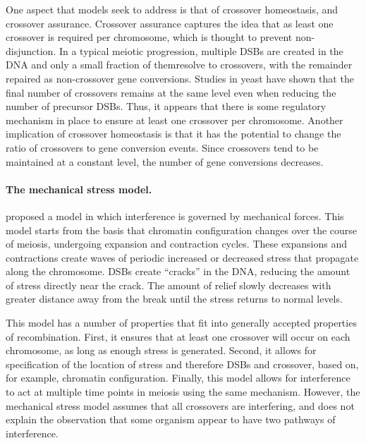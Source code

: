 One aspect that models seek to address is that of crossover homeostasis, and crossover assurance.
Crossover assurance captures the idea that as least one crossover is required per chromosome, which is thought to prevent non-disjunction.
In a typical meiotic progression, multiple DSBs are created in the DNA and only a small fraction of themresolve to crossovers, with the remainder repaired as non-crossover gene conversions.
Studies in yeast have shown that the final number of crossovers remains at the same level even when reducing the number of precursor DSBs\cite{Martini2006}.
Thus, it appears that there is some regulatory mechanism in place to ensure at least one crossover per chromosome.
Another implication of crossover homeostasis is that it has the potential to change the ratio of crossovers to gene conversion events.
Since crossovers tend to be maintained at a constant level, the number of gene conversions decreases.



\paragraph{The mechanical stress model.}
\citet{Kleckner2004} proposed a model in which interference is governed by mechanical forces.
This model starts from the basis that chromatin configuration changes over the course of meiosis, undergoing expansion and contraction cycles.
These expansions and contractions create waves of periodic increased or decreased stress that propagate along the chromosome.
DSBs create ``cracks'' in the DNA, reducing the amount of stress directly near the crack.
The amount of relief slowly decreases with greater distance away from the break until the stress returns to normal levels.

This model has a number of properties that fit into generally accepted properties of recombination.
First, it ensures that at least one crossover will occur on each chromosome, as long as enough stress is generated.
Second, it allows for specification of the location of stress and therefore DSBs and crossover, based on, for example, chromatin configuration.
Finally, this model allows for interference to act at multiple time points in meiosis using the same mechanism.
However, the mechanical stress model assumes that all crossovers are interfering, and does not explain the observation that some organism appear to have two pathways of interference.

